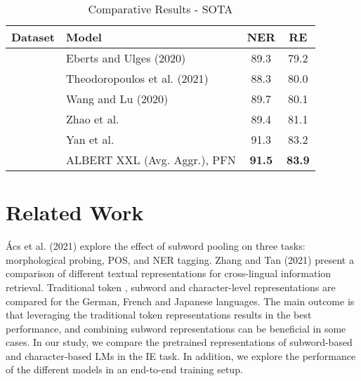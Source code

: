 \documentclass[runningheads]{llncs}
\begin{document}
\begin{table}[!h]
    \vspace{-7mm}
    \caption{Comparative Results - SOTA}
    \vspace{-3mm}
    \centering
    \begin{tabular}{llcc}
     \toprule
    Dataset & Model & NER & RE\\
    \midrule
    \parbox[t]{2mm}{} & Eberts and Ulges (2020) \cite{eberts2020span} & 89.3 & 79.2\\
                                                                    & Theodoropoulos et al. (2021) \cite{theodoropoulos-etal-2021-imposing} & 88.3 & 80.0\\
                                                                    & Wang and Lu (2020) \cite{wang-lu-2020-two} & 89.7 & 80.1\\
                                                                    & Zhao et al. \cite{ijcai2020-558} & 89.4 & 81.1\\
                                                                    & Yan et al. \cite{yan-etal-2021-partition} & 91.3 & 83.2\\
                                                                    & ALBERT XXL (Avg. Aggr.), PFN & \textbf{91.5} & \textbf{83.9}\\
    \midrule
    \end{tabular}
    \vspace{-10mm}
\end{table}

\section{Related Work}
\vspace{-3mm}
Ács et al. (2021) \cite{acs-etal-2021-subword} explore the effect of subword pooling on three tasks: morphological probing, POS, and NER tagging. Zhang and Tan (2021) \cite{zhang2021textual} present a comparison of different textual representations for cross-lingual information retrieval. Traditional token \cite{sasaki-etal-2018-cross}, subword \cite{tiedemann2020opus} and character-level representations are compared for the German, French and Japanese languages. The main outcome is that leveraging the traditional token representations results in the best performance, and combining subword representations can be beneficial in some cases. In our study, we compare the pretrained representations of subword-based and character-based LMs in the IE task. In addition, we explore the performance of the different models in an end-to-end training setup.
\end{document}
